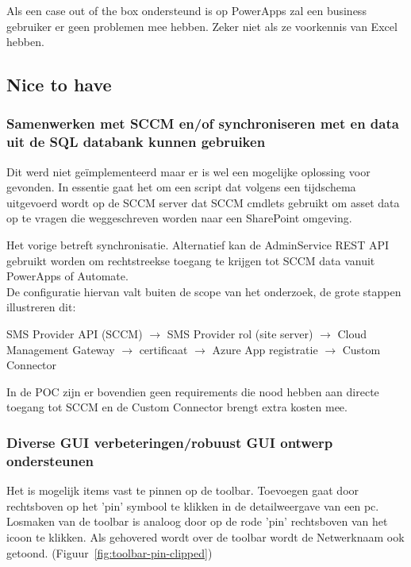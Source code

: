Als een case out of the box ondersteund is op PowerApps zal een business gebruiker er geen problemen mee hebben. Zeker niet als ze voorkennis van Excel hebben.

\subsection{Nice to have}

\subsubsection{Samenwerken met SCCM en/of synchroniseren met en data uit de SQL databank kunnen gebruiken}

Dit werd niet geïmplementeerd maar er is wel een mogelijke oplossing voor gevonden.
In essentie gaat het om een script dat volgens een tijdschema uitgevoerd wordt op de SCCM server dat SCCM cmdlets gebruikt om asset data op te vragen die weggeschreven worden naar een SharePoint omgeving.\autocite{Ziehnert2020}

Het vorige betreft synchronisatie. Alternatief kan de AdminService REST API gebruikt worden om rechtstreekse toegang te krijgen tot SCCM data vanuit PowerApps of Automate. \autocite{Gross2019}\\
De configuratie hiervan valt buiten de scope van het onderzoek, de grote stappen illustreren dit:

SMS Provider API (SCCM) $\rightarrow$ SMS Provider rol (site server) $\rightarrow$ Cloud Management Gateway $\rightarrow$ certificaat $\rightarrow$ Azure App registratie $\rightarrow$ Custom Connector

In de POC zijn er bovendien geen requirements die nood hebben aan directe toegang tot SCCM en de Custom Connector brengt extra kosten mee.

\subsubsection{Diverse GUI verbeteringen/robuust GUI ontwerp ondersteunen}


Het is mogelijk items vast te pinnen op de toolbar. Toevoegen gaat door rechtsboven op het 'pin' symbool te klikken in de detailweergave van een pc. Losmaken van de toolbar is analoog door op de rode 'pin' rechtsboven van het icoon te klikken. Als gehovered wordt over de toolbar wordt de Netwerknaam ook getoond. (Figuur~\ref{fig:toolbar-pin-clipped})

